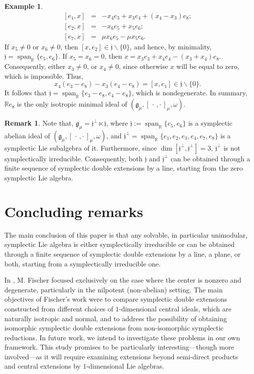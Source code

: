 \documentclass[final,1p,times,nopreprintline]{elsarticle}
\theoremstyle{definition}
\newtheorem{example}{Example}[section]
\newtheorem{remark}{Remark}[section]
\numberwithin{equation}{section}
\newcommand{\rel}{\mathbb{R}}
\newcommand{\w}{\omega}
\newcommand{\g}{\mathfrak{g}}
\newcommand{\Span}{\operatorname{span}}
\numberwithin{equation}{section}
\newcommand{\cro}{[\,\cdot\,,\cdot\,]}
\newcommand{\jj}{\mathfrak{j}}
\begin{document}
\begin{example}
\begin{eqnarray}\label{LiBraExample8SymDoubExtofIrr-3}
	\left[e_1,x\right]&=&-x_4e_3+x_3e_4+(x_4-x_3)e_8;\nonumber\\
	\left[e_2,x\right]&=&-x_6e_5+x_5e_6;\\
	\left[e_7,x\right]&=&\mu x_6e_5-\mu x_5e_6.\nonumber
\end{eqnarray}
If $x_5\neq 0$ or $x_6\neq 0$, then $[x,e_2]\in\jj\backslash\{0\}$, and hence, by minimality, $\jj=\Span_\rel\{e_5,e_6\}$. If $x_5=x_6=0$, then $x=x_3e_3+x_4e_4-(x_3+x_4)e_8$. Consequently, either $x_3\neq 0$, or $x_4\neq 0$, since otherwise $x$ will be equal to zero, which is impossible. Thus,
\begin{equation*}
x_4(e_3-e_8)-x_3(e_4-e_8)=[x,e_1]\in\jj\backslash\{0\}.
\end{equation*}
It follows that $\jj=\Span_\rel\{e_3-e_8,e_4-e_8\}$, which is nondegenerate. In summary, $\rel e_8$ is the only isotropic minimal ideal of $(\g_\mu,\cro_\mu,\w)$. 
\end{example}

\begin{remark}
Note that, $\g_\mu=\jj^\perp\ltimes\jj$, where $\jj:=\Span_\rel\{e_5,e_6\}$ is a symplectic abelian ideal of $(\g_\mu,\cro_\mu,\w)$, and $\jj^\perp=\Span_\rel\{e_1,e_2,e_3,e_4,e_7,e_8\}$ is a symplectic Lie subalgebra of it. Furthermore, since $\dim[\jj^\perp,\jj^\perp]=3$, $\jj^\perp$ is not symplectically irreducible. Consequently, both $\jj$ and $\jj^\perp$ can be obtained through a finite sequence of symplectic double extensions by a line, starting from the zero symplectic Lie algebra.
\end{remark}

\section{Concluding remarks} The main conclusion of this paper is that any solvable, in particular unimodular, symplectic Lie algebra is either symplectically irreducible or can be obtained through a finite sequence of symplectic double extensions by a line, a plane, or both, starting from a symplectically irreducible one.

In \cite{Fi}, M. Fischer focused exclusively on the case where the center is nonzero and degenerate, particularly in the nilpotent (non-abelian) setting. The main objectives of Fischer’s work were to compare symplectic double extensions constructed from different choices of $1$-dimensional central ideals, which are naturally isotropic and normal, and to address the possibility of obtaining isomorphic symplectic double extensions from non-isomorphic symplectic reductions. In future work, we intend to investigate these problems in our own framework. This study promises to be particularly interesting—though more involved—as it will require examining extensions beyond semi-direct products and central extensions by $1$-dimensional Lie algebras.
\end{document}

